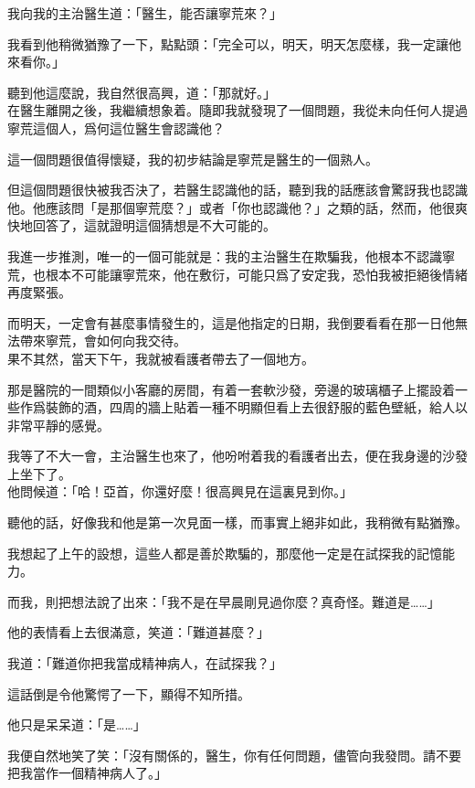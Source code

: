 我向我的主治醫生道：「醫生，能否讓寧荒來？」

我看到他稍微猶豫了一下，點點頭：「完全可以，明天，明天怎麼樣，我一定讓他來看你。」

聽到他這麼說，我自然很高興，道：「那就好。」
\\


在醫生離開之後，我繼續想象着。隨即我就發現了一個問題，我從未向任何人提過寧荒這個人，爲何這位醫生會認識他？

這一個問題很值得懷疑，我的初步結論是寧荒是醫生的一個熟人。

但這個問題很快被我否決了，若醫生認識他的話，聽到我的話應該會驚訝我也認識他。他應該問「是那個寧荒麼？」或者「你也認識他？」之類的話，然而，他很爽快地回答了，這就證明這個猜想是不大可能的。

我進一步推測，唯一的一個可能就是：我的主治醫生在欺騙我，他根本不認識寧荒，也根本不可能讓寧荒來，他在敷衍，可能只爲了安定我，恐怕我被拒絕後情緒再度緊張。

而明天，一定會有甚麼事情發生的，這是他指定的日期，我倒要看看在那一日他無法帶來寧荒，會如何向我交待。
\\


果不其然，當天下午，我就被看護者帶去了一個地方。

那是醫院的一間類似小客廳的房間，有着一套軟沙發，旁邊的玻璃櫃子上擺設着一些作爲裝飾的酒，四周的牆上貼着一種不明顯但看上去很舒服的藍色壁紙，給人以非常平靜的感覺。

我等了不大一會，主治醫生也來了，他吩咐着我的看護者出去，便在我身邊的沙發上坐下了。
\\


他問候道：「哈！亞首，你還好麼！很高興見在這裏見到你。」

聽他的話，好像我和他是第一次見面一樣，而事實上絕非如此，我稍微有點猶豫。

我想起了上午的設想，這些人都是善於欺騙的，那麼他一定是在試探我的記憶能力。

而我，則把想法說了出來：「我不是在早晨剛見過你麼？真奇怪。難道是……」

他的表情看上去很滿意，笑道：「難道甚麼？」

我道：「難道你把我當成精神病人，在試探我？」

這話倒是令他驚愕了一下，顯得不知所措。

他只是呆呆道：「是……」

我便自然地笑了笑：「沒有關係的，醫生，你有任何問題，儘管向我發問。請不要把我當作一個精神病人了。」

